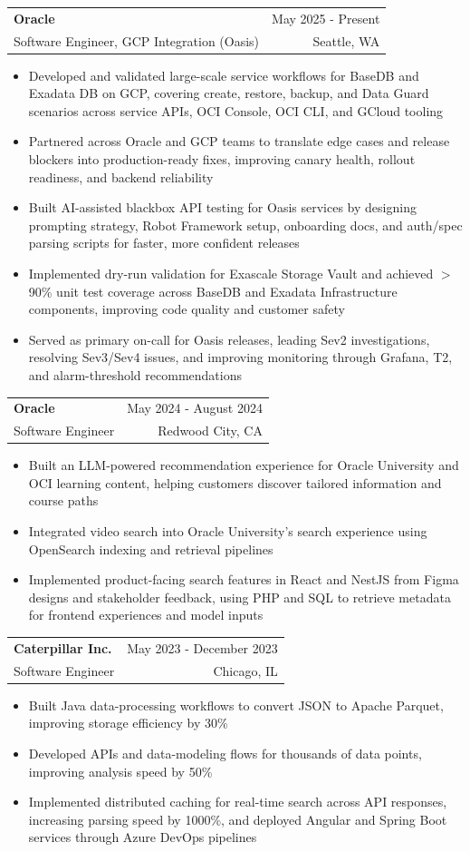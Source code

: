 \documentclass[letterpaper,11pt]{article}
\makeatletter
\newcommand{\resumeItem}[1]{
  \item\small{
    {#1 \vspace{-2pt}}
  }
}
\newcommand{\resumeSubheading}[4]{
  \vspace{-2pt}\item
    \begin{tabular*}{0.97\textwidth}[t]{l@{\extracolsep{\fill}}r}
      \textbf{#1} & #2 \\
      {\small#3} & {\small #4} \\
    \end{tabular*}\vspace{-7pt}
}
\newcommand{\resumeItemListStart}{\begin{itemize}}
\newcommand{\resumeItemListEnd}{\end{itemize}\vspace{-5pt}}
\makeatother
\begin{document}
    \resumeSubheading
  {Oracle}{May 2025 - Present}
  {Software Engineer, GCP Integration (Oasis)}{Seattle, WA}
  \resumeItemListStart
    \resumeItem{Developed and validated large-scale service workflows for BaseDB and Exadata DB on GCP, covering create, restore, backup, and Data Guard scenarios across service APIs, OCI Console, OCI CLI, and GCloud tooling}
    \resumeItem{Partnered across Oracle and GCP teams to translate edge cases and release blockers into production-ready fixes, improving canary health, rollout readiness, and backend reliability}
    \resumeItem{Built AI-assisted blackbox API testing for Oasis services by designing prompting strategy, Robot Framework setup, onboarding docs, and auth/spec parsing scripts for faster, more confident releases}
    \resumeItem{Implemented dry-run validation for Exascale Storage Vault and achieved $>$90\% unit test coverage across BaseDB and Exadata Infrastructure components, improving code quality and customer safety}
    \resumeItem{Served as primary on-call for Oasis releases, leading Sev2 investigations, resolving Sev3/Sev4 issues, and improving monitoring through Grafana, T2, and alarm-threshold recommendations}
  \resumeItemListEnd

    \resumeSubheading
      {Oracle}{May 2024 - August 2024}
      {Software Engineer}{Redwood City, CA}
      \resumeItemListStart
        \resumeItem{Built an LLM-powered recommendation experience for Oracle University and OCI learning content, helping customers discover tailored information and course paths}
        \resumeItem{Integrated video search into Oracle University's search experience using OpenSearch indexing and retrieval pipelines}
        \resumeItem{Implemented product-facing search features in React and NestJS from Figma designs and stakeholder feedback, using PHP and SQL to retrieve metadata for frontend experiences and model inputs}
      \resumeItemListEnd

    \resumeSubheading
      {Caterpillar Inc.}{May 2023 - December 2023}
      {Software Engineer}{Chicago, IL}
      \resumeItemListStart
        \resumeItem{Built Java data-processing workflows to convert JSON to Apache Parquet, improving storage efficiency by 30\%}
        \resumeItem{Developed APIs and data-modeling flows for thousands of data points, improving analysis speed by 50\%}
        \resumeItem{Implemented distributed caching for real-time search across API responses, increasing parsing speed by 1000\%, and deployed Angular and Spring Boot services through Azure DevOps pipelines}
      \resumeItemListEnd
\end{document}
